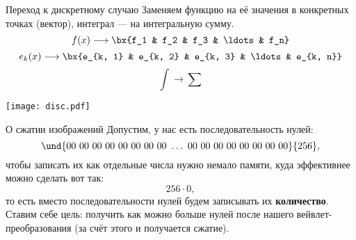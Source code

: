 \documentclass[aspectratio=169, 10pt]{beamer}
\begin{document}
	\begin{frame}{Переход к дискретному случаю}%
		Заменяем функцию на её значения в конкретных точках (вектор), интеграл --- на интегральную сумму.
		\[
			f(x) \longrightarrow \bx{f_1 & f_2 & f_3 & \ldots & f_n}
		\]
		\[
			e_k(x) \longrightarrow \bx{e_{k, 1} & e_{k, 2} & e_{k, 3} & \ldots & e_{k, n}}
		\]
		\[
			\int \longrightarrow \sum
		\]
		\begin{center}%
			\texttt{[image: disc.pdf]}
		\end{center}
	\end{frame}

	\begin{frame}{О сжатии изображений}%
		Допустим, у нас есть последовательность нулей:
		\begin{equation}
			\und{00 \ 00 \ 00 \ 00 \ 00 \ 00 \ 00 \ 00 \ \ldots \ 00 \ 00 \ 00 \ 00 \ 00 \ 00 \ 00 \ 00}{256},
		\end{equation}
		чтобы записать их как отдельные числа нужно немало памяти, куда эффективнее можно сделать вот так:
		\begin{equation}
			256 \cdot 0,
		\end{equation}
		то есть вместо последовательности нулей будем записывать их \textbf{количество}. Ставим себе цель: получить как можно больше нулей после нашего вейвлет-преобразования (за счёт этого и получается сжатие).
	\end{frame}
\end{document}
